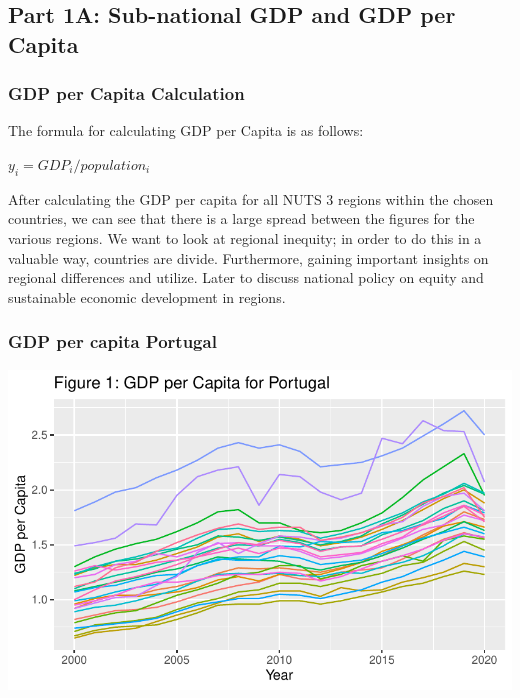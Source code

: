 \documentclass[
  a4paper,
  DIV=11,
  numbers=noendperiod]{scrartcl}
\begin{document}
\hypertarget{part-1a-sub-national-gdp-and-gdp-per-capita}{%
\subsection{Part 1A: Sub-national GDP and GDP per
Capita}\label{part-1a-sub-national-gdp-and-gdp-per-capita}}

\hypertarget{gdp-per-capita-calculation}{%
\subsubsection{GDP per Capita
Calculation}\label{gdp-per-capita-calculation}}

The formula for calculating GDP per Capita is as follows:

\(y_i=GDP_i/population_i\)

After calculating the GDP per capita for all NUTS 3 regions within the
chosen countries, we can see that there is a large spread between the
figures for the various regions. We want to look at regional inequity;
in order to do this in a valuable way, countries are divide.
Furthermore, gaining important insights on regional differences and
utilize. Later to discuss national policy on equity and sustainable
economic development in regions.

\hypertarget{gdp-per-capita-portugal}{%
\subsubsection{GDP per capita Portugal}\label{gdp-per-capita-portugal}}

\includegraphics{MSB104_GR_1_Final_Assignment_research_article_files/figure-pdf/unnamed-chunk-7-1.pdf}
\end{document}
